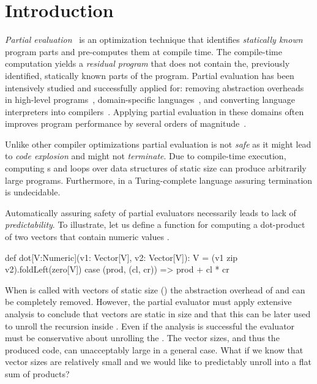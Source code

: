 \section{Introduction}
\label{sct:introduction}

\emph{Partial evaluation}~\cite{jones1993partial} is an optimization technique
that identifies \emph{statically known} program parts and pre-computes them at
compile time. The compile-time computation yields a \emph{residual program} that
does not contain the, previously identified, statically known parts of the
program.  Partial evaluation has been intensively studied and successfully
applied for: removing abstraction overheads in high-level
programs~\cite{carette2005multi,rompf2012lightweight}, domain-specific
languages~\cite{brady2010,jonnalagedda2014staged}, and converting language
interpreters into compilers~\cite{futamura1999partial,lancet,wurthinger2013one}.
Applying partial evaluation in these domains often improves program performance
by several orders of magnitude~\cite{shali2011Hybrid,brady2010}.

Unlike other compiler optimizations partial evaluation is not \emph{safe} as it
 might lead to \emph{code explosion} and might not \emph{terminate}. Due to
 compile-time execution,  computing s and loops over data structures
 of static size can produce arbitrarily  large programs. Furthermore, in a
 Turing-complete language assuring termination is undecidable.

Automatically assuring safety of partial evaluators necessarily leads to
 lack of \emph{predictability}. To illustrate, let us define a function
  for computing a dot-product of two vectors that contain numeric values
 .

\vspace{1.8mm}
\begin{listing}
  def dot[V:Numeric](v1: Vector[V], v2: Vector[V]): V =
    (v1 zip v2).foldLeft(zero[V]){ case (prod, (cl, cr)) =>
      prod + cl * cr
    }
\end{listing}
\vspace{1.8mm}

When  is called with vectors of static size (\eg {}) the abstraction overhead of  and 
 can be completely removed. However, the partial evaluator must apply extensive
 analysis to conclude that vectors are static in size and that this can be later
 used to unroll the recursion inside . Even if the analysis is
 successful the evaluator must be conservative about unrolling the
 . The vector sizes, and thus the produced code, can unacceptably
 large in a general case. What if we know that vector sizes are relatively small
 and we would like to predictably unroll   into a flat sum of products?


